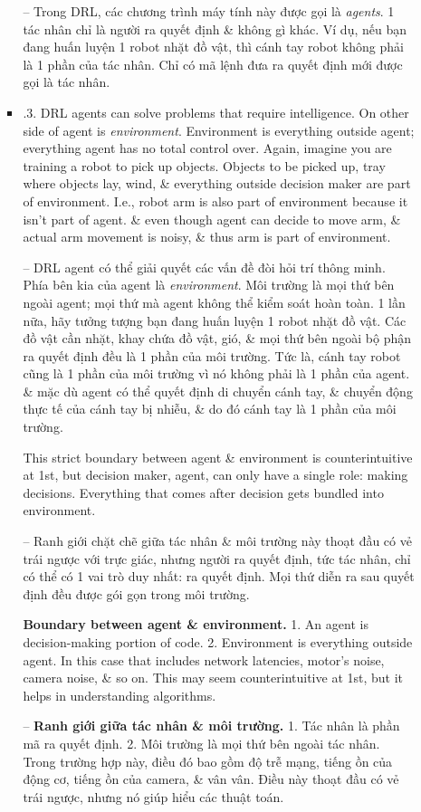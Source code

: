 \documentclass{article}
\begin{document}
\begin{itemize}
\begin{itemize}
\begin{itemize}
            -- Trong DRL, các chương trình máy tính này được gọi là {\it agents}. 1 tác nhân chỉ là người ra quyết định \& không gì khác. Ví dụ, nếu bạn đang huấn luyện 1 robot nhặt đồ vật, thì cánh tay robot không phải là 1 phần của tác nhân. Chỉ có mã lệnh đưa ra quyết định mới được gọi là tác nhân.
            \item {.3. DRL agents can solve problems that require intelligence.} On other side of agent is {\it environment}. Environment is everything outside agent; everything agent has no total control over. Again, imagine you are training a robot to pick up objects. Objects to be picked up, tray where objects lay, wind, \& everything outside decision maker are part of environment. I.e., robot arm is also part of environment because it isn't part of agent. \& even though agent can decide to move arm, \& actual arm movement is noisy, \& thus arm is part of environment.

            -- {\sf DRL agent có thể giải quyết các vấn đề đòi hỏi trí thông minh.} Phía bên kia của agent là {\it environment}. Môi trường là mọi thứ bên ngoài agent; mọi thứ mà agent không thể kiểm soát hoàn toàn. 1 lần nữa, hãy tưởng tượng bạn đang huấn luyện 1 robot nhặt đồ vật. Các đồ vật cần nhặt, khay chứa đồ vật, gió, \& mọi thứ bên ngoài bộ phận ra quyết định đều là 1 phần của môi trường. Tức là, cánh tay robot cũng là 1 phần của môi trường vì nó không phải là 1 phần của agent. \& mặc dù agent có thể quyết định di chuyển cánh tay, \& chuyển động thực tế của cánh tay bị nhiễu, \& do đó cánh tay là 1 phần của môi trường.

            This strict boundary between agent \& environment is counterintuitive at 1st, but decision maker, agent, can only have a single role: making decisions. Everything that comes after decision gets bundled into environment.

            -- Ranh giới chặt chẽ giữa tác nhân \& môi trường này thoạt đầu có vẻ trái ngược với trực giác, nhưng người ra quyết định, tức tác nhân, chỉ có thể có 1 vai trò duy nhất: ra quyết định. Mọi thứ diễn ra sau quyết định đều được gói gọn trong môi trường.

            {\bf Boundary between agent \& environment.} 1. An agent is decision-making portion of code. 2. Environment is everything outside agent. In this case that includes network latencies, motor's noise, camera noise, \& so on. This may seem counterintuitive at 1st, but it helps in understanding algorithms.

            -- {\bf Ranh giới giữa tác nhân \& môi trường.} 1. Tác nhân là phần mã ra quyết định. 2. Môi trường là mọi thứ bên ngoài tác nhân. Trong trường hợp này, điều đó bao gồm độ trễ mạng, tiếng ồn của động cơ, tiếng ồn của camera, \& vân vân. Điều này thoạt đầu có vẻ trái ngược, nhưng nó giúp hiểu các thuật toán.


\end{itemize}
\end{itemize}
\end{itemize}
\end{document}
